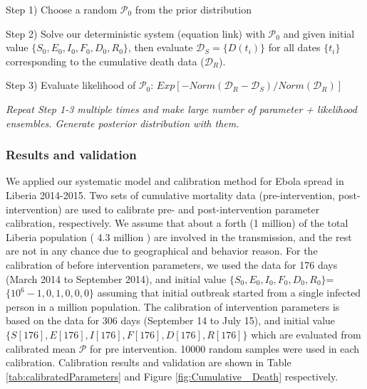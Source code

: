 Step 1) Choose a random $\mathcal{P}_0$ from the prior distribution

Step 2) Solve our deterministic system (equation link) with $\mathcal{P}_0$ and given initial value $\{S_0,E_0,I_0,F_0,D_0,R_0\}$, then evaluate $\mathcal{D}_S=\{D(t_i)\}$ for all dates $\{t_i\}$ corresponding to the cumulative death data ($\mathcal{D}_R$).

Step 3) Evaluate likelihood of $\mathcal{P}_0$: $Exp[-Norm(\mathcal{D}_R-\mathcal{D}_S)/Norm(\mathcal{D}_R)]$

\emph{Repeat Step 1-3 multiple times and make large number of {parameter + likelihood} ensembles. Generate posterior distribution with them.}

\subsubsection{Results and validation}
We applied our systematic model and calibration method for Ebola spread in Liberia 2014-2015. Two sets of cumulative mortality data (pre-intervention, post-intervention) are used to calibrate pre- and post-intervention parameter calibration, respectively. We assume that about a forth (1 million) of the total Liberia population ( 4.3 million \cite{LiberiaPop}) are involved in the transmission, and the rest are not in any chance due to geographical and behavior reason. For the calibration of before intervention parameters, we used the data for 176 days (March 2014 to September 2014), and initial value $\{S_0,E_0,I_0,F_0,D_0,R_0\}$=$\{10^6-1,0,1,0,0,0\}$ assuming that initial outbreak started from a single infected person in a million population. The calibration of intervention parameters is based on the data for 306 days (September 14 to July 15), and initial value $\{S[176],E[176],I[176],F[176],D[176],R[176]\}$ which are evaluated from calibrated mean $\mathcal{P}$ for pre intervention. 10000 random samples were used in each calibration. Calibration results and validation are shown in Table \ref{tab:calibratedParameters} and Figure \ref{fig:Cumulative _Death} respectively.\\

